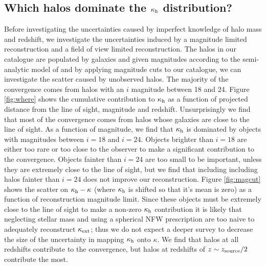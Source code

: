 \documentclass[useAMS,usenatbib]{mn2e}
\begin{document}
\subsection{Which halos dominate the $\kappa_{\rm h}$ distribution?}

Before investigating the uncertainties caused by imperfect knowledge of halo mass and redshift, we investigate the uncertainties induced by a magnitude limited reconstruction and a field of view limited reconstruction. The halos in our catalogue are populated by galaxies and given magnitudes according to the semi-analytic model of \citet{deLucia+Blaizot2007} and by applying magnitude cuts to our catalogue, we can investigate the scatter caused by unobserved halos. The majority of the convergence comes from halos with an $i$ magnitude between 18 and 24. Figure \ref{fig:where} shows the cumulative contribution to $\kappa_{\rm h}$ as a function of projected distance from the line of sight, magnitude and redshift. Unsurprisingly we find that most of the convergence comes from halos whose galaxies are close to the line of sight. As a function of magnitude, we find that $\kappa_{\rm h}$ is dominated by objects with magnitudes between $i=18$ and $i=24$. Objects brighter than $i=18$ are either too rare or too close to the observer to make a significant contribution to the convergence. Objects fainter than $i=24$ are too small to be important, unless they are extremely close to the line of sight, but we find that including including halos fainter than $i=24$ does not improve our reconstruction. Figure \ref{fig:magcut} shows the scatter on $\kappa_{\rm h}-\kappa$ (where $\kappa_{\rm h}$ is shifted so that it's mean is zero) as a function of reconstruction magnitude limit. Since these objects must be extremely close to the line of sight to make a non-zero $\kappa_{\rm h}$ contribution it is likely that neglecting stellar mass and using a spherical NFW prescription are too naive to adequately reconstruct $\kappa_{\rm ext}$; thus we do not expect a deeper survey to decrease the size of the uncertainty in mapping $\kappa_{\rm h}$ onto $\kappa$. We find that halos at all redshifts contribute to the convergence, but halos at redshifts of $z \sim z_{\rm source}/2$ contribute the most.  
\end{document}
